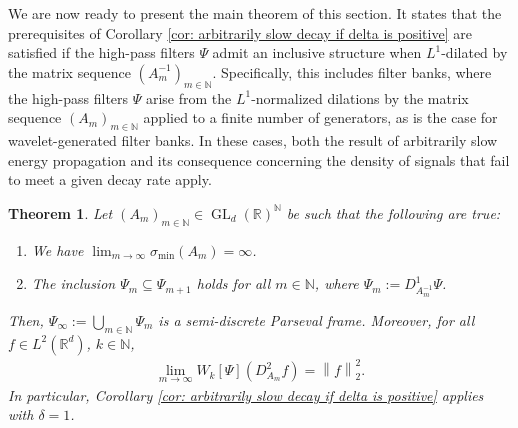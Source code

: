 \documentclass[11pt]{amsart}
\newcommand{\R}{{\mathbb{R}}}
\newcommand{\N}{\mathbb{N}}
\newcommand{\norm}[1]{\ensuremath{\left\lVert\text{}#1\text{}\right\rVert}}
\DeclareMathOperator{\GL}{GL}
\newtheorem{theorem}{Theorem}[section]
\newenvironment{proof sketch} {\textit{Proof sketch.}}{}
\newenvironment{myenum}
{ \begin{enumerate}
    \setlength{\itemsep}{3pt}
    \setlength{\parskip}{0pt}
    \setlength{\parsep}{0pt}     }
{ \end{enumerate}                  }
\begin{document}
  We are now ready to present the main theorem of this section. It states that the prerequisites of Corollary \ref{cor: arbitrarily slow decay if delta is positive} are satisfied if the high-pass filters $\Psi$ admit an inclusive structure when $L^1$-dilated by the matrix sequence $(A_m^{-1})_{m \in \N}$. Specifically, this includes filter banks, where the high-pass filters $\Psi$ arise from the $L^1$-normalized dilations by the matrix sequence $(A_m)_{m \in \N}$ applied to a finite number of generators, as is the case for wavelet-generated filter banks. In these cases, both the result of arbitrarily slow energy propagation and its consequence concerning the density of signals that fail to meet a given decay rate apply.
  
  \begin{theorem}\label{thm: slow propagation if filters are dilation invariant}
    Let $(A_m)_{m \in \N} \in \GL_d(\R)^\N$ be such that the following are true:
    \begin{myenum}
      \item[(i)] We have  
      $\lim_{m \to \infty}\sigma_{\text{min}}(A_m)=\infty$.
      \item[(ii)] The inclusion $\Psi_{m} \subseteq \Psi_{m+1}$ holds for all $m \in \N$, where $\Psi_m:=D_{A_m^{-1}}^1\Psi$.
    \end{myenum}
  
    Then, $\Psi_\infty:=\bigcup_{m \in \N} \Psi_m$ is a semi-discrete Parseval frame. Moreover, for all $f \in L^2(\R^d)$, $k \in \N$,
    \begin{align*}
      \lim_{m \to \infty} W_k[\Psi]\left(D_{A_m}^2f\right)=\norm{f}_2^2.
    \end{align*}
    In particular, Corollary \ref{cor: arbitrarily slow decay if delta is positive} applies with $\delta=1$.
  \end{theorem}
  
\end{document}
